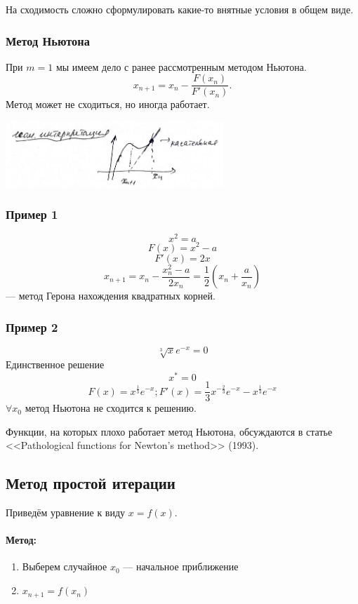 На сходимость сложно сформулировать какие-то внятные условия в общем виде.

\subsubsection{Метод Ньютона}
При $m=1$ мы имеем дело с ранее рассмотренным методом Ньютона. 
\[
	x_{n+1} = x_n - \frac{F(x_n)}{F'(x_n)}.
\]
Метод может не сходиться, но иногда работает.
\begin{center}
	\includegraphics[width=8.2cm]{../figures/lection_1/figure_2.png}
\end{center}

\subsubsection{Пример 1}
\[x^2=a\]
\[F(x) = x^2 - a\]
\[F'(x) = 2x\]
\[x_{n+1} = x_n - \frac{x^2_n - a}{2x_n} = \frac{1}{2}(x_n+\frac{a}{x_n})\] --- метод Герона нахождения квадратных корней.

\subsubsection{Пример 2}
\[\sqrt[3]{x}e^{-x} = 0\]
Единственное решение \[x^* = 0\] 
\[F(x) = x^{\frac{1}{3}} e^{-x}; F'(x) = \frac{1}{3}x^{-\frac{2}{3}}e^{-x} - x^{\frac{1}{3}}e^{-x}\] 
$\forall x_0$ метод Ньютона не сходится к решению.

Функции, на которых плохо работает метод Ньютона, обсуждаются в статье <<Pathological functions for Newton's method>> (1993).

\subsection{Метод простой итерации}
Приведём уравнение к виду $x = f(x)$.
\paragraph{Метод:} \begin{enumerate}
    \item Выберем случайное $x_0$ --- начальное приближение
    \item $x_{n+1} = f(x_n)$
\end{enumerate}
